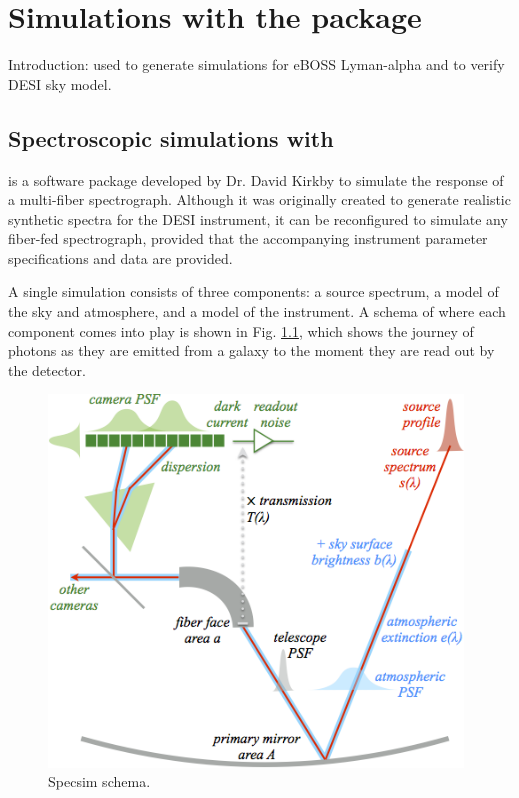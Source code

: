 \chapter{Simulations with the  package}

Introduction: used to generate simulations for eBOSS Lyman-alpha and to verify DESI sky model. 

\section{Spectroscopic simulations with }

 \cite{Kirkby_21} is a software package developed by Dr. David Kirkby to simulate the response of a multi-fiber spectrograph. Although it was originally created to generate realistic synthetic spectra for the DESI instrument, it can be reconfigured to simulate any fiber-fed spectrograph, provided that the accompanying instrument parameter specifications and data are provided.

A single simulation consists of three components: a source spectrum, a model of the sky and atmosphere, and a model of the instrument. A schema of where each component comes into play is shown in Fig. \ref{fig:schema}, which shows the journey of photons as they are emitted from a galaxy to the moment they are read out by the detector.

\begin{figure}[h]
\centering
\includegraphics[width=11cm]{images/specsim/overview.png}
\caption{Specsim schema.}
\label{fig:schema}
\end{figure}

